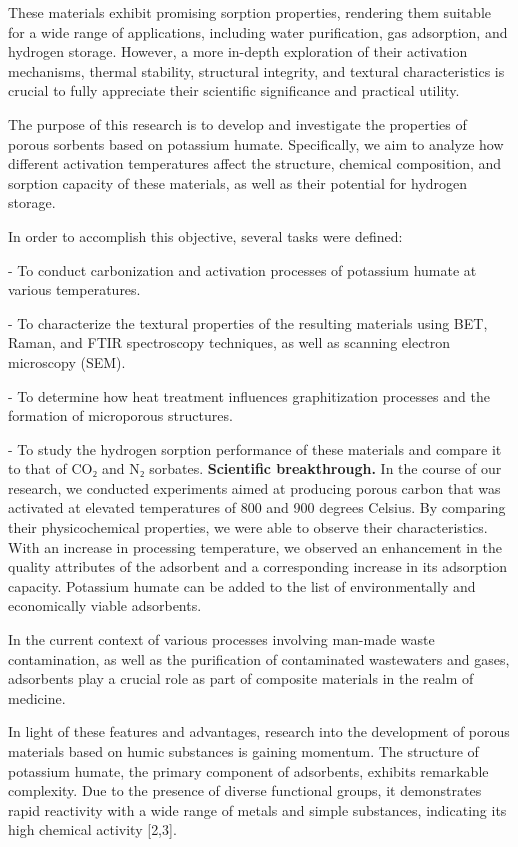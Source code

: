 These materials exhibit promising sorption properties, rendering them
suitable for a wide range of applications, including water purification,
gas adsorption, and hydrogen storage. However, a more in-depth
exploration of their activation mechanisms, thermal stability,
structural integrity, and textural characteristics is crucial to fully
appreciate their scientific significance and practical utility.

The purpose of this research is to develop and investigate the
properties of porous sorbents based on potassium humate. Specifically,
we aim to analyze how different activation temperatures affect the
structure, chemical composition, and sorption capacity of these
materials, as well as their potential for hydrogen storage.

In order to accomplish this objective, several tasks were defined:


- To conduct carbonization and activation processes of potassium humate
at various temperatures.

- To characterize the textural properties of the resulting materials
using BET, Raman, and FTIR spectroscopy techniques, as well as
scanning electron microscopy (SEM).

- To determine how heat treatment influences graphitization processes
and the formation of microporous structures.

- To study the hydrogen sorption performance of these materials and
compare it to that of CO₂ and N₂ sorbates.
{\bfseries Scientific breakthrough.} In the course of our research, we
conducted experiments aimed at producing porous carbon that was
activated at elevated temperatures of 800 and 900 degrees Celsius. By
comparing their physicochemical properties, we were able to observe
their characteristics. With an increase in processing temperature, we
observed an enhancement in the quality attributes of the adsorbent and a
corresponding increase in its adsorption capacity. Potassium humate can
be added to the list of environmentally and economically viable
adsorbents.

In the current context of various processes involving man-made waste
contamination, as well as the purification of contaminated wastewaters
and gases, adsorbents play a crucial role as part of composite materials
in the realm of medicine.

In light of these features and advantages, research into the development
of porous materials based on humic substances is gaining momentum. The
structure of potassium humate, the primary component of adsorbents,
exhibits remarkable complexity. Due to the presence of diverse
functional groups, it demonstrates rapid reactivity with a wide range of
metals and simple substances, indicating its high chemical activity
{[}2,3{]}.

